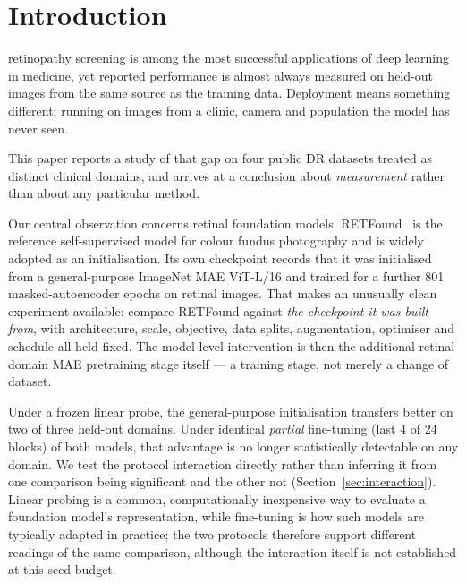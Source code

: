\documentclass[journal]{IEEEtran}
\begin{document}
\section{Introduction}
 retinopathy screening is among the most successful
applications of deep learning in medicine, yet reported performance is almost
always measured on held-out images from the same source as the training data.
Deployment means something different: running on images from a clinic, camera
and population the model has never seen.

This paper reports a study of that gap on four public DR datasets treated as
distinct clinical domains, and arrives at a conclusion about \emph{measurement}
rather than about any particular method.

Our central observation concerns retinal foundation models. RETFound~\cite{zhou2023retfound}
is the reference self-supervised model for colour fundus photography and is
widely adopted as an initialisation. Its own checkpoint records that it was
initialised from a general-purpose ImageNet MAE ViT-L/16 and trained for a
further 801 masked-autoencoder epochs on retinal images. That makes an unusually
clean experiment available: compare RETFound against \emph{the checkpoint it was
built from}, with architecture, scale, objective, data splits, augmentation,
optimiser and schedule all held fixed. The model-level intervention is then the
additional retinal-domain MAE pretraining stage itself --- a training stage, not
merely a change of dataset.

Under a frozen linear probe, the general-purpose initialisation transfers
better on two of three held-out domains. Under identical \emph{partial}
fine-tuning (last 4 of 24 blocks) of both models, that advantage is no longer
statistically detectable on any domain. We test the protocol interaction
directly rather than inferring it from one comparison being significant and the
other not (Section~\ref{sec:interaction}). Linear probing is a common, computationally inexpensive way to evaluate a
foundation model's representation, while fine-tuning is how such models are
typically adapted in practice; the two protocols therefore support different
readings of the same comparison, although the interaction itself is not
established at this seed budget.
\end{document}
